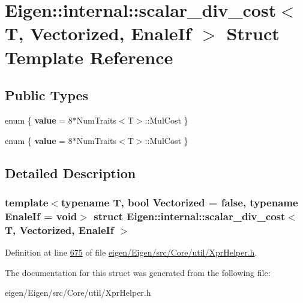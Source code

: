 \hypertarget{struct_eigen_1_1internal_1_1scalar__div__cost}{}\section{Eigen\+:\+:internal\+:\+:scalar\+\_\+div\+\_\+cost$<$ T, Vectorized, Enale\+If $>$ Struct Template Reference}
\label{struct_eigen_1_1internal_1_1scalar__div__cost}
\subsection*{Public Types}
\begin{DoxyCompactItemize}
\item 
\mbox{\label{struct_eigen_1_1internal_1_1scalar__div__cost_addba839184bd06bca1373ec1d4b4e4cb}} 
enum \{ {\bfseries value} = 8$\ast$\+Num\+Traits$<$T$>$\+:\+:Mul\+Cost
 \}
\item 
\mbox{\label{struct_eigen_1_1internal_1_1scalar__div__cost_a82aa2d21c4c9c19a1e77a99d326db0b7}} 
enum \{ {\bfseries value} = 8$\ast$\+Num\+Traits$<$T$>$\+:\+:Mul\+Cost
 \}
\end{DoxyCompactItemize}


\subsection{Detailed Description}
\subsubsection*{template$<$typename T, bool Vectorized = false, typename Enale\+If = void$>$\newline
struct Eigen\+::internal\+::scalar\+\_\+div\+\_\+cost$<$ T, Vectorized, Enale\+If $>$}



Definition at line \hyperlink{eigen_2_eigen_2src_2_core_2util_2_xpr_helper_8h_source_l00675}{675} of file \hyperlink{eigen_2_eigen_2src_2_core_2util_2_xpr_helper_8h_source}{eigen/\+Eigen/src/\+Core/util/\+Xpr\+Helper.\+h}.



The documentation for this struct was generated from the following file\+:\begin{DoxyCompactItemize}
\item 
eigen/\+Eigen/src/\+Core/util/\+Xpr\+Helper.\+h\end{DoxyCompactItemize}
